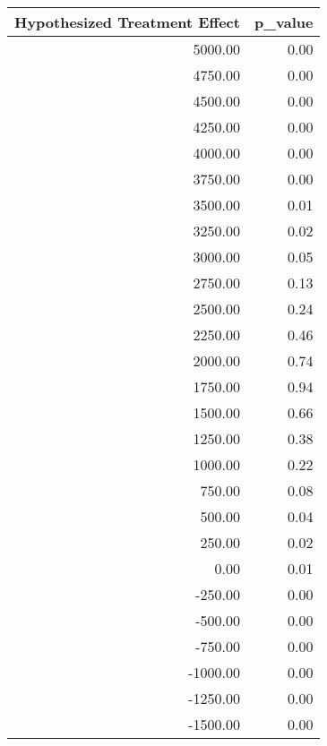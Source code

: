 \begin{tabular}{rr}
  \hline
Hypothesized Treatment Effect & p\_value \\ 
  \hline
5000.00 & 0.00 \\ 
  4750.00 & 0.00 \\ 
  4500.00 & 0.00 \\ 
  4250.00 & 0.00 \\ 
  4000.00 & 0.00 \\ 
  3750.00 & 0.00 \\ 
  3500.00 & 0.01 \\ 
  3250.00 & 0.02 \\ 
  3000.00 & 0.05 \\ 
  2750.00 & 0.13 \\ 
  2500.00 & 0.24 \\ 
  2250.00 & 0.46 \\ 
  2000.00 & 0.74 \\ 
  1750.00 & 0.94 \\ 
  1500.00 & 0.66 \\ 
  1250.00 & 0.38 \\ 
  1000.00 & 0.22 \\ 
  750.00 & 0.08 \\ 
  500.00 & 0.04 \\ 
  250.00 & 0.02 \\ 
  0.00 & 0.01 \\ 
  -250.00 & 0.00 \\ 
  -500.00 & 0.00 \\ 
  -750.00 & 0.00 \\ 
  -1000.00 & 0.00 \\ 
  -1250.00 & 0.00 \\ 
  -1500.00 & 0.00 \\ 
   \hline
\end{tabular}
